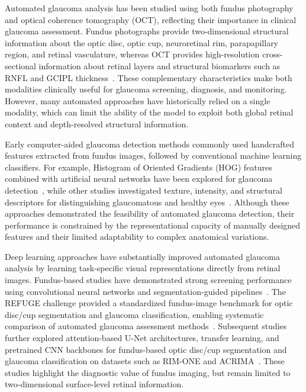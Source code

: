 \documentclass[preprint,12pt]{elsarticle}
\begin{document}
Automated glaucoma analysis has been studied using both fundus photography and optical coherence tomography (OCT), reflecting their importance in clinical glaucoma assessment. Fundus photographs provide two-dimensional structural information about the optic disc, optic cup, neuroretinal rim, parapapillary region, and retinal vasculature, whereas OCT provides high-resolution cross-sectional information about retinal layers and structural biomarkers such as RNFL and GCIPL thickness~\cite{kanski10,jayaram2023glaucoma}. These complementary characteristics make both modalities clinically useful for glaucoma screening, diagnosis, and monitoring. However, many automated approaches have historically relied on a single modality, which can limit the ability of the model to exploit both global retinal context and depth-resolved structural information.

Early computer-aided glaucoma detection methods commonly used handcrafted features extracted from fundus images, followed by conventional machine learning classifiers. For example, Histogram of Oriented Gradients (HOG) features combined with artificial neural networks have been explored for glaucoma detection~\cite{singh2022hog}, while other studies investigated texture, intensity, and structural descriptors for distinguishing glaucomatous and healthy eyes~\cite{velpula2024automated,pathan2023automated}. Although these approaches demonstrated the feasibility of automated glaucoma detection, their performance is constrained by the representational capacity of manually designed features and their limited adaptability to complex anatomical variations.

Deep learning approaches have substantially improved automated glaucoma analysis by learning task-specific visual representations directly from retinal images. Fundus-based studies have demonstrated strong screening performance using convolutional neural networks and segmentation-guided pipelines~\cite{cho2021deep,shyamalee2022attention}. The REFUGE challenge provided a standardized fundus-image benchmark for optic disc/cup segmentation and glaucoma classification, enabling systematic comparison of automated glaucoma assessment methods~\cite{orlando2020refuge}. Subsequent studies further explored attention-based U-Net architectures, transfer learning, and pretrained CNN backbones for fundus-based optic disc/cup segmentation and glaucoma classification on datasets such as RIM-ONE and ACRIMA~\cite{shyamalee2022glaucoma,diaz2019cnns,shyamalee2022cnn}. These studies highlight the diagnostic value of fundus imaging, but remain limited to two-dimensional surface-level retinal information.
\end{document}
